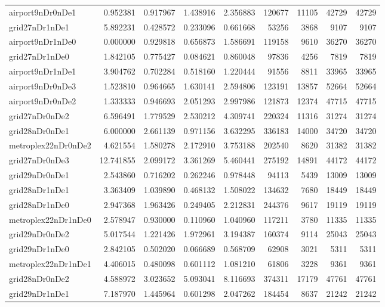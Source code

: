 \documentclass[../../../thesis.tex]{subfiles}
\begin{document}
\begin{longtable}{|l|r|r|r|r|r|r|r|r|}
airport9nDr0nDe1 & 0.952381 & 0.917967 & 1.438916 & 2.356883 & 120677 & 11105 & 42729 & 42729 \\
grid27nDr1nDe1 & 5.892231 & 0.428572 & 0.233096 & 0.661668 & 53256 & 3868 & 9107 & 9107 \\
airport9nDr1nDe0 & 0.000000 & 0.929818 & 0.656873 & 1.586691 & 119158 & 9610 & 36270 & 36270 \\
grid27nDr1nDe0 & 1.842105 & 0.775427 & 0.084621 & 0.860048 & 97836 & 4256 & 7819 & 7819 \\
airport9nDr1nDe1 & 3.904762 & 0.702284 & 0.518160 & 1.220444 & 91556 & 8811 & 33965 & 33965 \\
airport9nDr0nDe3 & 1.523810 & 0.964665 & 1.630141 & 2.594806 & 123191 & 13857 & 52664 & 52664 \\
airport9nDr0nDe2 & 1.333333 & 0.946693 & 2.051293 & 2.997986 & 121873 & 12374 & 47715 & 47715 \\
grid27nDr0nDe2 & 6.596491 & 1.779529 & 2.530212 & 4.309741 & 220324 & 11316 & 31274 & 31274 \\
grid28nDr0nDe1 & 6.000000 & 2.661139 & 0.971156 & 3.632295 & 336183 & 14000 & 34720 & 34720 \\
metroplex22nDr0nDe2 & 4.621554 & 1.580278 & 2.172910 & 3.753188 & 202540 & 8620 & 31382 & 31382 \\
grid27nDr0nDe3 & 12.741855 & 2.099172 & 3.361269 & 5.460441 & 275192 & 14891 & 44172 & 44172 \\
grid29nDr0nDe1 & 2.543860 & 0.716202 & 0.262246 & 0.978448 & 94113 & 5439 & 13009 & 13009 \\
grid28nDr1nDe1 & 3.363409 & 1.039890 & 0.468132 & 1.508022 & 134632 & 7680 & 18449 & 18449 \\
grid28nDr1nDe0 & 2.947368 & 1.963426 & 0.249405 & 2.212831 & 244376 & 9617 & 19119 & 19119 \\
metroplex22nDr1nDe0 & 2.578947 & 0.930000 & 0.110960 & 1.040960 & 117211 & 3780 & 11335 & 11335 \\
grid29nDr0nDe2 & 5.017544 & 1.221426 & 1.972961 & 3.194387 & 160374 & 9114 & 25043 & 25043 \\
grid29nDr1nDe0 & 2.842105 & 0.502020 & 0.066689 & 0.568709 & 62908 & 3021 & 5311 & 5311 \\
metroplex22nDr1nDe1 & 4.406015 & 0.480098 & 0.601112 & 1.081210 & 61806 & 3228 & 9361 & 9361 \\
grid28nDr0nDe2 & 4.588972 & 3.023652 & 5.093041 & 8.116693 & 374311 & 17179 & 47761 & 47761 \\
grid29nDr1nDe1 & 7.187970 & 1.445964 & 0.601298 & 2.047262 & 184454 & 8637 & 21242 & 21242 \\

\end{longtable}
\end{document}

